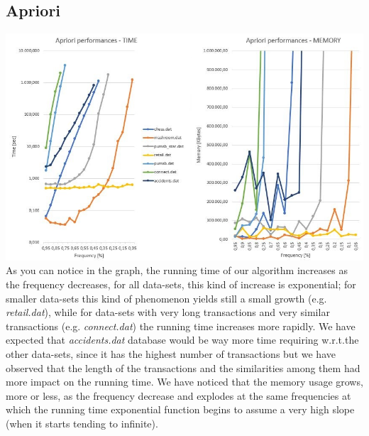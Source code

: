 \documentclass[11pt, a4paper]{article}
\begin{document}
		\subsection{Apriori}
			\includegraphics[scale =0.6]{Apriori.JPG}
			\noindent\newline
			As you can notice in the graph, the running time of our algorithm increases as the frequency decreases, for all data-sets, this kind of increase is exponential; for smaller data-sets this kind of phenomenon yields still a small growth (e.g. \textit{retail.dat}), while for data-sets with very long transactions and very similar transactions (e.g. \textit{connect.dat}) the running time increases more rapidly. \newline
			We have expected that \textit{accidents.dat} database would be way more time requiring w.r.t.the other data-sets, since it has the highest number of transactions but we have observed that the length of the transactions and the similarities among them had more impact on the running time. \newline
			We have noticed that the memory usage grows, more or less, as the frequency decrease and explodes at the same frequencies at which the running time exponential function begins to assume a very high slope (when it starts tending to infinite).\newline
		
\end{document}
